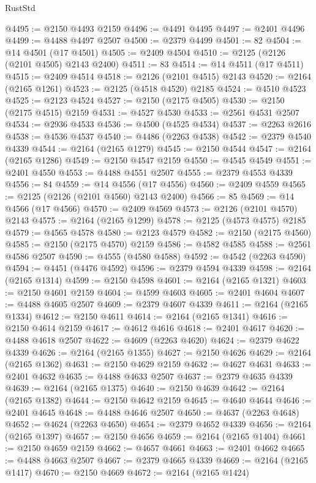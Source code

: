 \begin{lexlean}{RustStd}
\begin{coremodule}
@4495 := @2150 @4493 @2159
@4496 := @4491 @4495
@4497 := @2401 @4496
@4499 := @4488 @4497 @2507
@4500 := @2379 @4499
@4501 := 82
@4504 := @14 @4501 (@17 @4501)
@4505 := @2409 @4504
@4510 := @2125 (@2126 (@2101 @4505) @2143 @2400)
@4511 := 83
@4514 := @14 @4511 (@17 @4511)
@4515 := @2409 @4514
@4518 := @2126 (@2101 @4515) @2143
@4520 := @2164 (@2165 @1261)
@4523 := @2125 (@4518 @4520) @2185
@4524 := @4510 @4523
@4525 := @2123 @4524
@4527 := @2150 (@2175 @4505)
@4530 := @2150 (@2175 @4515) @2159
@4531 := @4527 @4530
@4533 := @2561 @4531 @2507
@4534 := @2936 @4533
@4536 := @4500 (@4525 @4534)
@4537 := @2263 @2616
@4538 := @4536 @4537
@4540 := @4486 (@2263 @4538)
@4542 := @2379 @4540 @4339
@4544 := @2164 (@2165 @1279)
@4545 := @2150 @4544
@4547 := @2164 (@2165 @1286)
@4549 := @2150 @4547 @2159
@4550 := @4545 @4549
@4551 := @2401 @4550
@4553 := @4488 @4551 @2507
@4555 := @2379 @4553 @4339
@4556 := 84
@4559 := @14 @4556 (@17 @4556)
@4560 := @2409 @4559
@4565 := @2125 (@2126 (@2101 @4560) @2143 @2400)
@4566 := 85
@4569 := @14 @4566 (@17 @4566)
@4570 := @2409 @4569
@4573 := @2126 (@2101 @4570) @2143
@4575 := @2164 (@2165 @1299)
@4578 := @2125 (@4573 @4575) @2185
@4579 := @4565 @4578
@4580 := @2123 @4579
@4582 := @2150 (@2175 @4560)
@4585 := @2150 (@2175 @4570) @2159
@4586 := @4582 @4585
@4588 := @2561 @4586 @2507
@4590 := @4555 (@4580 @4588)
@4592 := @4542 (@2263 @4590)
@4594 := @4451 (@4476 @4592)
@4596 := @2379 @4594 @4339
@4598 := @2164 (@2165 @1314)
@4599 := @2150 @4598
@4601 := @2164 (@2165 @1321)
@4603 := @2150 @4601 @2159
@4604 := @4599 @4603
@4605 := @2401 @4604
@4607 := @4488 @4605 @2507
@4609 := @2379 @4607 @4339
@4611 := @2164 (@2165 @1334)
@4612 := @2150 @4611
@4614 := @2164 (@2165 @1341)
@4616 := @2150 @4614 @2159
@4617 := @4612 @4616
@4618 := @2401 @4617
@4620 := @4488 @4618 @2507
@4622 := @4609 (@2263 @4620)
@4624 := @2379 @4622 @4339
@4626 := @2164 (@2165 @1355)
@4627 := @2150 @4626
@4629 := @2164 (@2165 @1362)
@4631 := @2150 @4629 @2159
@4632 := @4627 @4631
@4633 := @2401 @4632
@4635 := @4488 @4633 @2507
@4637 := @2379 @4635 @4339
@4639 := @2164 (@2165 @1375)
@4640 := @2150 @4639
@4642 := @2164 (@2165 @1382)
@4644 := @2150 @4642 @2159
@4645 := @4640 @4644
@4646 := @2401 @4645
@4648 := @4488 @4646 @2507
@4650 := @4637 (@2263 @4648)
@4652 := @4624 (@2263 @4650)
@4654 := @2379 @4652 @4339
@4656 := @2164 (@2165 @1397)
@4657 := @2150 @4656
@4659 := @2164 (@2165 @1404)
@4661 := @2150 @4659 @2159
@4662 := @4657 @4661
@4663 := @2401 @4662
@4665 := @4488 @4663 @2507
@4667 := @2379 @4665 @4339
@4669 := @2164 (@2165 @1417)
@4670 := @2150 @4669
@4672 := @2164 (@2165 @1424)

\end{coremodule}
\end{lexlean}
